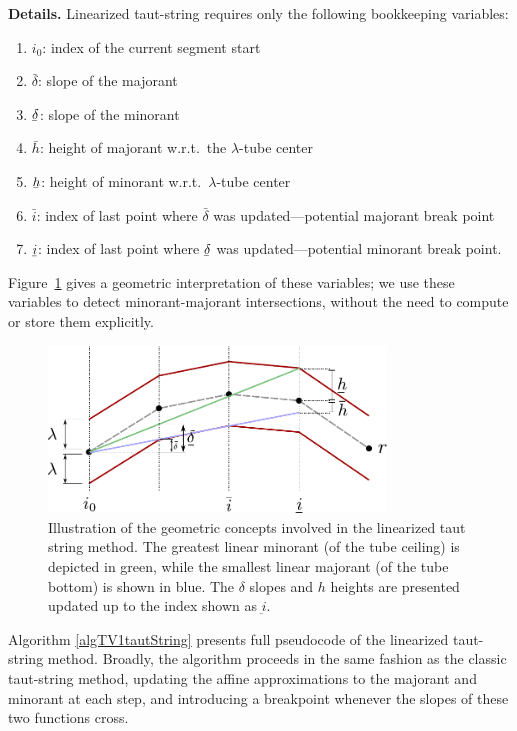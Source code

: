 \documentclass[twoside,11pt]{article}
\newcommand{\ubar}[1]{\underaccent{\bar}{#1}}
\numberwithin{equation}{section}
\numberwithin{theorem}{section}
\begin{document}
\vskip5pt
\noindent\textbf{Details.} Linearized taut-string requires only the following bookkeeping variables:
\begin{enumerate}
  \vspace*{-2pt}
  \setlength{\itemsep}{-2pt}
 \item $i_0$: index of the current segment start
 \item $\bar \delta$: slope of the majorant
 \item $\ubar \delta$: slope of the minorant
 \item $\bar h$: height of majorant w.r.t.\ the $\lambda$-tube center
 \item $\ubar h$: height of minorant w.r.t.\ $\lambda$-tube center
 \item $\bar i$: index of last point where $\bar \delta$ was updated---potential majorant break point
 \item $\ubar i$: index of last point where $\ubar \delta$ was updated---potential minorant break point.
\end{enumerate}
Figure~\ref{fig:tautStringAlgVariables} gives a geometric interpretation of these variables; we use these variables to detect  minorant-majorant intersections, without the need to compute or store them explicitly.

\begin{figure}[ht]
  \centering
  \includegraphics[width = 0.8\textwidth]{tautStringAlgVariables}
  \caption{\small Illustration of the geometric concepts involved in the linearized taut string method. The greatest linear minorant (of the tube ceiling) is depicted in green, while the smallest linear majorant (of the tube bottom) is shown in blue. The $\delta$ slopes and $h$ heights are presented updated up to the index shown as $\underbar i$.
   }   \label{fig:tautStringAlgVariables}
\end{figure}

Algorithm \ref{algTV1tautString} presents full pseudocode of the linearized taut-string method. Broadly, the algorithm proceeds in the same fashion as the classic taut-string method, updating the affine approximations to the majorant and minorant at each step, and introducing a breakpoint whenever the slopes of these two functions cross.
\end{document}
